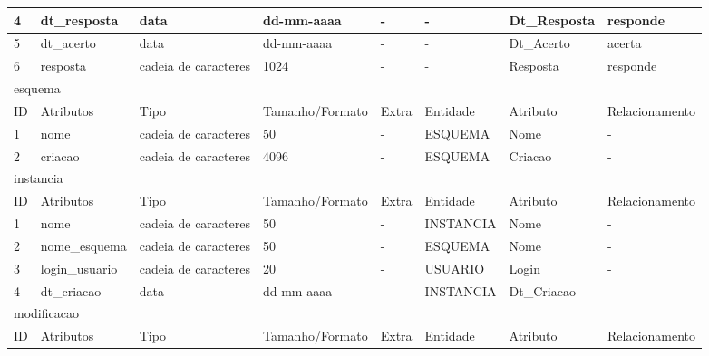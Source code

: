 \documentclass[graduacao,brazil]{ThesisPUC}
\begin{document}
\begin{table}[H]
{\begin{tabular}{|l|l|l|l|l|l|l|l|}
    4                       & dt\_resposta   & data                 & dd-mm-aaaa      & -                & -               & Dt\_Resposta   & responde        \\ \hline
    5                       & dt\_acerto     & data                 & dd-mm-aaaa      & -                & -               & Dt\_Acerto     & acerta          \\ \hline
    6                       & resposta       & cadeia de caracteres & 1024            & -                & -               & Resposta       & responde        \\ \hline
    \multicolumn{8}{|l|}{esquema} \\ \hline
    ID                      & Atributos      & Tipo                 & Tamanho/Formato & Extra            & Entidade        & Atributo       & Relacionamento  \\ \hline
    1                       & nome           & cadeia de caracteres & 50              & -                & ESQUEMA         & Nome           & -               \\ \hline
    2                       & criacao        & cadeia de caracteres & 4096            & -                & ESQUEMA         & Criacao        & -               \\ \hline
    \multicolumn{8}{|l|}{instancia} \\ \hline
    ID                      & Atributos      & Tipo                 & Tamanho/Formato & Extra            & Entidade        & Atributo       & Relacionamento  \\ \hline
    1                       & nome           & cadeia de caracteres & 50              & -                & INSTANCIA       & Nome           & -               \\ \hline
    2                       & nome\_esquema  & cadeia de caracteres & 50              & -                & ESQUEMA         & Nome           & -               \\ \hline
    3                       & login\_usuario & cadeia de caracteres & 20              & -                & USUARIO         & Login          & -               \\ \hline
    4                       & dt\_criacao    & data                 & dd-mm-aaaa      & -                & INSTANCIA       & Dt\_Criacao    & -               \\ \hline
    \multicolumn{8}{|l|}{modificacao} \\ \hline
    ID                      & Atributos      & Tipo                 & Tamanho/Formato & Extra            & Entidade        & Atributo       & Relacionamento  \\ \hline

\end{tabular}}
\end{table}
\end{document}
